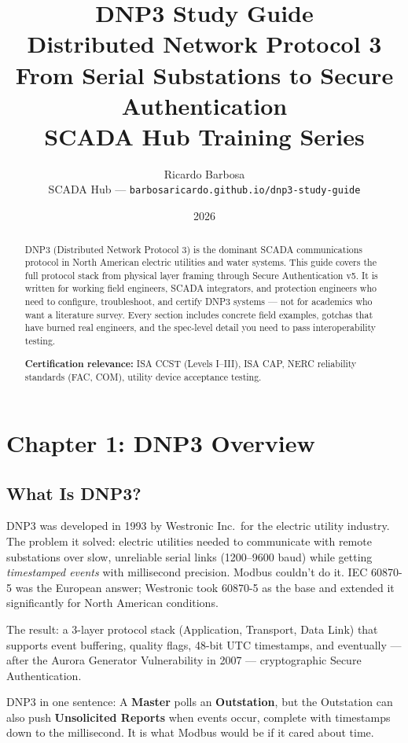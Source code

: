 \documentclass[11pt,twoside]{article}
\title{%
  {\Huge\bfseries DNP3 Study Guide}\\[6pt]
  {\large Distributed Network Protocol 3}\\[4pt]
  {\normalsize From Serial Substations to Secure Authentication}\\[12pt]
  {\small SCADA Hub Training Series}
}
\author{Ricardo Barbosa \\ \small SCADA Hub --- \texttt{barbosaricardo.github.io/dnp3-study-guide}}
\date{2026}
\begin{document}
\maketitle
\thispagestyle{empty}

\begin{abstract}
\noindent
DNP3 (Distributed Network Protocol 3) is the dominant SCADA communications protocol in North American electric utilities and water systems. This guide covers the full protocol stack from physical layer framing through Secure Authentication v5. It is written for working field engineers, SCADA integrators, and protection engineers who need to configure, troubleshoot, and certify DNP3 systems --- not for academics who want a literature survey. Every section includes concrete field examples, gotchas that have burned real engineers, and the spec-level detail you need to pass interoperability testing.

\textbf{Certification relevance:} ISA CCST (Levels I--III), ISA CAP, NERC reliability standards (FAC, COM), utility device acceptance testing.
\end{abstract}

\tableofcontents
\newpage

\section{Chapter 1: DNP3 Overview}

\subsection{What Is DNP3?}

DNP3 was developed in 1993 by Westronic Inc.\ for the electric utility industry. The problem it solved: electric utilities needed to communicate with remote substations over slow, unreliable serial links (1200--9600 baud) while getting \emph{timestamped events} with millisecond precision. Modbus couldn't do it. IEC 60870-5 was the European answer; Westronic took 60870-5 as the base and extended it significantly for North American conditions.

The result: a 3-layer protocol stack (Application, Transport, Data Link) that supports event buffering, quality flags, 48-bit UTC timestamps, and eventually --- after the Aurora Generator Vulnerability in 2007 --- cryptographic Secure Authentication.

\begin{keybox}
DNP3 in one sentence: A \textbf{Master} polls an \textbf{Outstation}, but the Outstation can also push \textbf{Unsolicited Reports} when events occur, complete with timestamps down to the millisecond. It is what Modbus would be if it cared about time.
\end{keybox}
\end{document}
